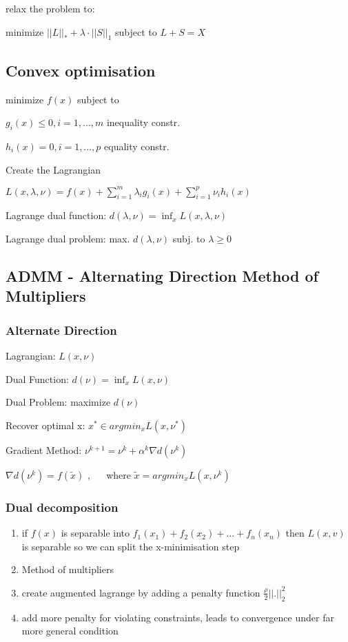 \documentclass[11pt,twocolumn]{article}
\begin{document}
relax the problem to:

minimize 	$||L||_* + \lambda \cdot ||S||_1$
subject to 	$L+S = X$

\subsection{Convex optimisation}

minimize $f(x)$ subject to 

$g_i(x) \leq 0, i = 1,...,m$ inequality constr.

$h_i(x) = 0, i = 1,...,p$ equality constr.

Create the Lagrangian

$L(x, \lambda, \nu) = f(x) + \sum_{i=1}^m{\lambda_i g_i(x) + \sum_{i=1}^p{\nu_i h_i(x)}}$

Lagrange dual function: $ d(\lambda, \nu) = \inf_{x} L (x,\lambda, \nu) $

Lagrange dual problem: max. $d(\lambda, \nu)$  subj. to $\lambda \geq 0$

\subsection{ADMM - Alternating Direction Method of Multipliers}


\subsubsection{Alternate Direction}


Lagrangian: $L(x,\nu)$

Dual Function: $d(\nu)=\inf_x L(x,\nu)$

Dual Problem: maximize $d(\nu)$

Recover optimal x: $x^* \in argmin_x L(x, \nu^*)$

Gradient Method: $\nu^{k+1} = \nu^k + \alpha^k \nabla d(\nu^k)$

$\nabla  d (\nu^k) = f(\tilde{x})$ , ~~ where
$\tilde{x} = argmin_x L(x, \nu^k)$

\subsubsection{Dual decomposition}

\begin{enumerate}

\item if $f(x)$ is separable into $f_1(x_1) + f_2(x_2) + ... + f_n(x_n)$
	  then $L(x,v)$ is separable
	  so we can split the x-minimisation step
\item Method of multipliers
\item create augmented lagrange by adding a penalty function $\frac{\rho}{2}|| .||^2_2$
\item add more penalty for violating constraints, leads to convergence under far more general condition
	
\end{enumerate}
\end{document}
